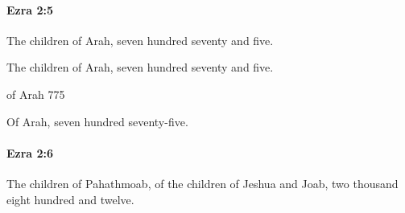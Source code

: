 		\paragraph{Ezra 2:5} %
			\label{EZRA-2-5}

			The children of Arah, seven hundred seventy and five.

			\begin{versebox}
					\item[BHS] 
					\item[LXX] 
					\item[ASV] The children of Arah, seven hundred seventy and five.
					\item[NIV] of Arah 775
					\item[NRSV] Of Arah, seven hundred seventy-five.
			\end{versebox}

		\paragraph{Ezra 2:6} %
			\label{EZRA-2-6}

			The children of Pahathmoab, of the children of Jeshua and Joab, two thousand eight hundred and twelve.

